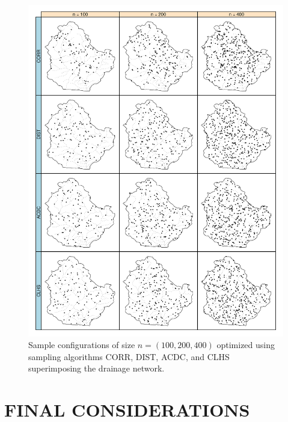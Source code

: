 \begin{figure}[!ht]
 \centering
 \includegraphics[width=\textwidth]{fig/chap07-points_corr_dist_acdc_clhs}
 \caption[Sample configurations optimized using four sampling algorithms.]{Sample configurations of size 
 $n = (100, 200, 400)$ optimized using sampling algorithms CORR, DIST,  ACDC, and CLHS superimposing the
 drainage network.}
 \label{fig:chap07-points}
\end{figure}

\section{FINAL CONSIDERATIONS}


